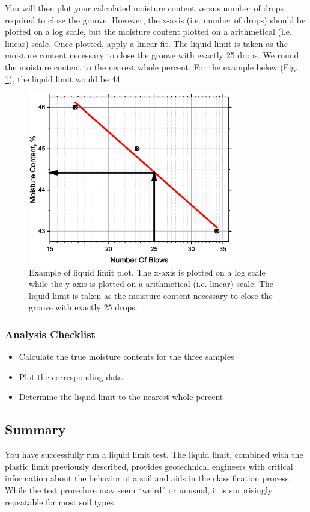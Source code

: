 \documentclass[12pt]{article}
\begin{document}
You will then plot your calculated moisture content versus number of drops required to close the groove. However, the x-axis (i.e. number of drops) should be plotted on a log scale, but the moisture content plotted on a arithmetical (i.e. linear) scale. Once plotted, apply a linear fit. The liquid limit is taken as the moisture content necessary to close the groove with exactly 25 drops. We round the moisture content to the nearest whole percent. For the example below (Fig. \ref{fig:exampleLL}), the liquid limit would be 44.

\begin{figure}[H]
    \centering
    \includegraphics[width=0.8\textwidth]{Graph1.eps}
    \caption{Example of liquid limit plot. The x-axis is plotted on a log scale while the y-axis is plotted on a arithmetical (i.e. linear) scale. The liquid limit is taken as the moisture content necessary to close the groove with exactly 25 drops.}
    \label{fig:exampleLL}
\end{figure}

\subsubsection*{Analysis Checklist}
\begin{itemize}
    \item Calculate the true moisture contents for the three samples
    \item Plot the corresponding data
    \item Determine the liquid limit to the nearest whole percent
\end{itemize}

\subsection{Summary}
You have successfully run a liquid limit test. The liquid limit, combined with the plastic limit previously described, provides geotechnical engineers with critical information about the behavior of a soil and aids in the classification process. While the test procedure may seem ``weird'' or unusual, it is surprisingly repeatable for most soil types.
\end{document}
